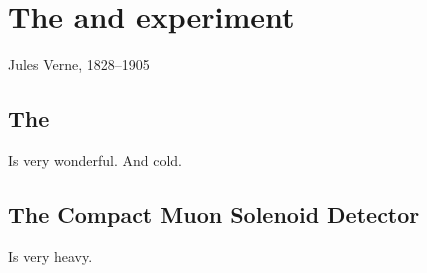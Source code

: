 \chapter{The \LHC and \CMS experiment}
\label{chap:detector}

{Jules Verne, 1828--1905}

\section{The \LHC}
Is very wonderful. And cold.


\section{The Compact Muon Solenoid Detector}
Is very heavy.
